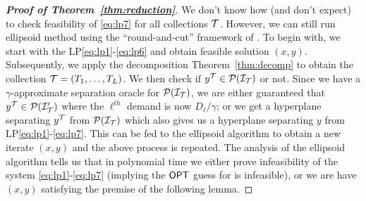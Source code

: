 \begin{proof}[{\bf Proof of Theorem~\ref{thm:reduction}}]
\noindent
We don't know how (and don't expect) to check feasibility of  \eqref{eq:lp7} for all collections ${\cal T}$. However, we can still run ellipsoid method using the ``round-and-cut'' framework of \cite{CarrFLP00,ChakrabartyCKK11,Li15,Li16}.
To begin with, we start with the LP\eqref{eq:lp1}-\eqref{eq:lp6} and obtain feasible solution $(x,y)$. Subsequently, we apply the decomposition Theorem~\ref{thm:decomp} to obtain the collection ${\cal T} = (T_1,\ldots,T_L)$.
We then check if $y^{\cal T} \in {\cal P}({\cal I}_{\cal T})$ or not. Since we have a $\gamma$-approximate separation oracle for ${\cal P}({\cal I}_{\cal T})$, we  are either guaranteed that $y^{\cal T} \in {\cal P}({\cal I}'_{\cal T})$ where the $\ell^{th}$ demand is now  $D_\ell/\gamma$; or we get a hyperplane separating $y^{\cal T}$ from ${\cal P}({\cal I}_{\cal T})$ which also gives us a
hyperplane separating $y$ from  LP\eqref{eq:lp1}-\eqref{eq:lp7}. This can be fed to the ellipsoid algorithm to obtain a new iterate $(x,y)$ and the above process is repeated. The analysis of the ellipsoid algorithm
tells us that in polynomial time we either prove infeasibility of the system \eqref{eq:lp1}-\eqref{eq:lp7} (implying the $\mathsf{OPT}$  guess for \mckc is infeasible), or we 
are have $(x,y)$ satisfying the premise of the following lemma. 


\end{proof}
